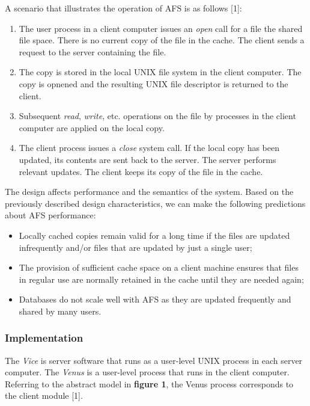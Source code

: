 A scenario that illustrates the operation of AFS is as follows [1]:
\begin{enumerate}
	\item The user process in a client computer issues an \textit{open} call for a file the shared file space. There is no current copy of the file in the cache. The client sends a request to the server containing the file.
	\item The copy is stored in the local UNIX file system in the client computer. The copy is opnened and the resulting UNIX file descriptor is returned to the client.
	\item Subsequent \textit{read}, \textit{write}, etc. operations on the file by processes in the client computer are applied on the local copy.
	\item The client process issues a \textit{close} system call. If the local copy has been updated, its contents are sent back to the server. The server performs relevant updates. The client keeps its copy of the file in the cache.
\end{enumerate}

The design affects performance and the semantics of the system. Based on the previously described design characteristics, we can make the following predictions about AFS performance:
\begin{itemize}
	\item Locally cached copies remain valid for a long time if the files are updated infrequently and/or files that are updated by just a single user;
	\item The provision of sufficient cache space on a client machine ensures that files in regular use are normally retained in the cache until they are needed again;
	\item Databases do not scale well with AFS as they are updated frequently and shared by many users.
\end{itemize}



\subsubsection{Implementation}

The \emph{Vice} is server software that runs as a user-level UNIX process in each server computer. The \emph{Venus} is a user-level process that runs in the client computer. Referring to the abstract model in \textbf{figure 1}, the Venus process corresponds to the client module [1].

